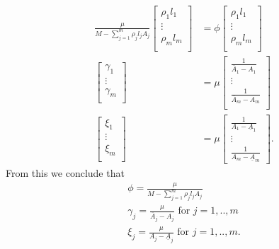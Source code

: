 \begin{align*}
\frac{\mu}{M-\sum\limits_{j=1}^m\rho_jl_jA_j}
\begin{bmatrix}
\rho_1l_1 \\
\vdots \\
\rho_ml_m\\
\end{bmatrix} &= \phi
\begin{bmatrix}
\rho_1l_1 \\
\vdots \\
\rho_ml_m\\
\end{bmatrix}\\
\begin{bmatrix}
\gamma_1 \\
\vdots \\
\gamma_m\\
\end{bmatrix} &= \mu
\begin{bmatrix}
\frac{1}{\overline{A}_1-A_1} \\
\vdots \\
\frac{1}{\overline{A}_m-A_m}\\
\end{bmatrix}\\
\begin{bmatrix}
\xi_1 \\
\vdots \\
\xi_m\\
\end{bmatrix} 
&= \mu
\begin{bmatrix}
\frac{1}{A_1-\underline{A}_1} \\
\vdots \\
\frac{1}{A_m-\underline{A}_m}
\end{bmatrix}.
\end{align*}
From this we conclude that
\begin{align*}
\phi = \frac{\mu}{M-\sum\limits_{j=1}^m\rho_jl_jA_j}\\
\gamma_j = \frac{\mu}{\overline{A}_j-A_j} \text{ for } j = 1,..,m \\
\xi_j = \frac{\mu}{A_j-\underline{A}_j} \text{ for } j = 1,..,m.
\end{align*}

